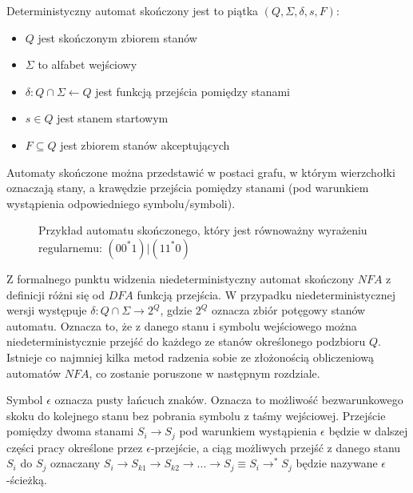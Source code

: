 Deterministyczny automat skończony jest to piątka $(Q, \Sigma, \delta, s, F)$:
\begin{itemize}
    \item $Q$ jest skończonym zbiorem stanów
    \item $\Sigma$ to alfabet wejściowy
    \item $\delta: Q \cap \Sigma \leftarrow Q$ jest funkcją przejścia pomiędzy stanami
    \item $s \in Q$ jest stanem startowym
    \item $F \subseteq Q$ jest zbiorem stanów akceptujących
\end{itemize}
Automaty skończone można przedstawić w postaci grafu, w którym wierzchołki oznaczają stany, a krawędzie
przejścia pomiędzy stanami (pod warunkiem wystąpienia odpowiedniego symbolu/symboli).
\begin{figure}
    \centering
    \caption{Przykład automatu skończonego, który jest równoważny wyrażeniu regularnemu: $(00^{*}1)|(11^{*}0)$}
\end{figure}
\par
Z formalnego punktu widzenia niedeterministyczny automat skończony $NFA$ z definicji różni się od $DFA$ funkcją
przejścia. W przypadku niedeterministycznej wersji występuje $\delta: Q \cap \Sigma \rightarrow 2^Q$, gdzie
$2^Q$ oznacza zbiór potęgowy stanów automatu. Oznacza to, że z danego stanu i symbolu wejściowego można
niedeterministycznie przejść do każdego ze stanów określonego podzbioru $Q$. Istnieje co najmniej kilka
metod radzenia sobie ze złożonością obliczeniową automatów $NFA$, co zostanie poruszone w następnym rozdziale.

\par
Symbol $\epsilon$ oznacza pusty łańcuch znaków. Oznacza to możliwość bezwarunkowego skoku do kolejnego stanu bez
pobrania symbolu z taśmy wejściowej. Przejście pomiędzy dwoma stanami $S_i \rightarrow S_j$ pod warunkiem wystąpienia
$\epsilon$ będzie w dalszej części pracy określone przez $\epsilon$-przejście, a ciąg możliwych przejść z danego stanu
$S_i$ do $S_j$ oznaczany
$S_i \rightarrow S_{k1} \rightarrow S_{k2} \rightarrow ... \rightarrow S_j \equiv S_i \rightarrow^* S_j$ będzie nazywane
$\epsilon$-ścieżką.

